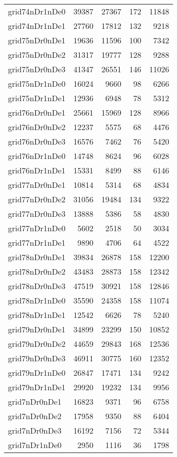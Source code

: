 \begin{longtable}{lrrrr}
grid74nDr1nDe0 & 39387 & 27367 & 172 & 11848 \\
grid74nDr1nDe1 & 27760 & 17812 & 132 & 9218 \\
grid75nDr0nDe1 & 19636 & 11596 & 100 & 7342 \\
grid75nDr0nDe2 & 31317 & 19777 & 128 & 9288 \\
grid75nDr0nDe3 & 41347 & 26551 & 146 & 11026 \\
grid75nDr1nDe0 & 16024 & 9660 & 98 & 6266 \\
grid75nDr1nDe1 & 12936 & 6948 & 78 & 5312 \\
grid76nDr0nDe1 & 25661 & 15969 & 128 & 8966 \\
grid76nDr0nDe2 & 12237 & 5575 & 68 & 4476 \\
grid76nDr0nDe3 & 16576 & 7462 & 76 & 5420 \\
grid76nDr1nDe0 & 14748 & 8624 & 96 & 6028 \\
grid76nDr1nDe1 & 15331 & 8499 & 88 & 6146 \\
grid77nDr0nDe1 & 10814 & 5314 & 68 & 4834 \\
grid77nDr0nDe2 & 31056 & 19484 & 134 & 9322 \\
grid77nDr0nDe3 & 13888 & 5386 & 58 & 4830 \\
grid77nDr1nDe0 & 5602 & 2518 & 50 & 3034 \\
grid77nDr1nDe1 & 9890 & 4706 & 64 & 4522 \\
grid78nDr0nDe1 & 39834 & 26878 & 158 & 12200 \\
grid78nDr0nDe2 & 43483 & 28873 & 158 & 12342 \\
grid78nDr0nDe3 & 47519 & 30921 & 158 & 12846 \\
grid78nDr1nDe0 & 35590 & 24358 & 158 & 11074 \\
grid78nDr1nDe1 & 12542 & 6626 & 78 & 5240 \\
grid79nDr0nDe1 & 34899 & 23299 & 150 & 10852 \\
grid79nDr0nDe2 & 44659 & 29843 & 168 & 12536 \\
grid79nDr0nDe3 & 46911 & 30775 & 160 & 12352 \\
grid79nDr1nDe0 & 26847 & 17471 & 134 & 9242 \\
grid79nDr1nDe1 & 29920 & 19232 & 134 & 9956 \\
grid7nDr0nDe1 & 16823 & 9371 & 96 & 6758 \\
grid7nDr0nDe2 & 17958 & 9350 & 88 & 6404 \\
grid7nDr0nDe3 & 16192 & 7156 & 72 & 5344 \\
grid7nDr1nDe0 & 2950 & 1116 & 36 & 1798 \\

\end{longtable}
